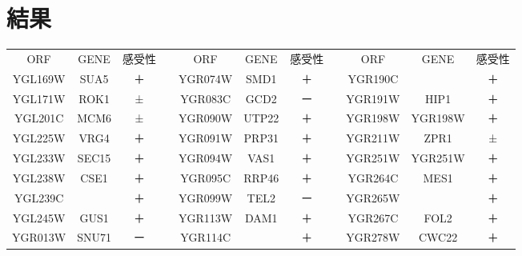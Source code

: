 \documentclass[a4paper,papersize,dvipdfmx]{jsarticle}
\begin{document}
\section*{結果}
\begin{table}[H]
  \centering
\begin{tabular}{|c|c|c|c|c|c|c|cccc}
\cline{1-3} \cline{5-7} \cline{9-11}
ORF     & GENE    & 感受性 &  & ORF     & GENE  & 感受性 & \multicolumn{1}{c|}{} & \multicolumn{1}{c|}{ORF}     & \multicolumn{1}{c|}{GENE}    & \multicolumn{1}{c|}{感受性} \\ \cline{1-3} \cline{5-7} \cline{9-11}
YGL169W & SUA5    & ＋   &  & YGR074W & SMD1  & ＋   & \multicolumn{1}{c|}{} & \multicolumn{1}{c|}{YGR190C} & \multicolumn{1}{c|}{}        & \multicolumn{1}{c|}{＋}   \\ \cline{1-3} \cline{5-7} \cline{9-11}
YGL171W & ROK1    & ±   &  & YGR083C & GCD2  & ー   & \multicolumn{1}{c|}{} & \multicolumn{1}{c|}{YGR191W} & \multicolumn{1}{c|}{HIP1}    & \multicolumn{1}{c|}{＋}   \\ \cline{1-3} \cline{5-7} \cline{9-11}
YGL201C & MCM6    & ±   &  & YGR090W & UTP22 & ＋   & \multicolumn{1}{c|}{} & \multicolumn{1}{c|}{YGR198W} & \multicolumn{1}{c|}{YGR198W} & \multicolumn{1}{c|}{＋}   \\ \cline{1-3} \cline{5-7} \cline{9-11}
YGL225W & VRG4    & ＋   &  & YGR091W & PRP31 & ＋   & \multicolumn{1}{c|}{} & \multicolumn{1}{c|}{YGR211W} & \multicolumn{1}{c|}{ZPR1}    & \multicolumn{1}{c|}{±}   \\ \cline{1-3} \cline{5-7} \cline{9-11}
YGL233W & SEC15   & ＋   &  & YGR094W & VAS1  & ＋   & \multicolumn{1}{c|}{} & \multicolumn{1}{c|}{YGR251W} & \multicolumn{1}{c|}{YGR251W} & \multicolumn{1}{c|}{＋}   \\ \cline{1-3} \cline{5-7} \cline{9-11}
YGL238W & CSE1    & ＋   &  & YGR095C & RRP46 & ＋   & \multicolumn{1}{c|}{} & \multicolumn{1}{c|}{YGR264C} & \multicolumn{1}{c|}{MES1}    & \multicolumn{1}{c|}{＋}   \\ \cline{1-3} \cline{5-7} \cline{9-11}
YGL239C &         & ＋   &  & YGR099W & TEL2  & ー   & \multicolumn{1}{c|}{} & \multicolumn{1}{c|}{YGR265W} & \multicolumn{1}{c|}{}        & \multicolumn{1}{c|}{＋}   \\ \cline{1-3} \cline{5-7} \cline{9-11}
YGL245W & GUS1    & ＋   &  & YGR113W & DAM1  & ＋   & \multicolumn{1}{c|}{} & \multicolumn{1}{c|}{YGR267C} & \multicolumn{1}{c|}{FOL2}    & \multicolumn{1}{c|}{＋}   \\ \cline{1-3} \cline{5-7} \cline{9-11}
YGR013W & SNU71   & ー   &  & YGR114C &       & ＋   & \multicolumn{1}{c|}{} & \multicolumn{1}{c|}{YGR278W} & \multicolumn{1}{c|}{CWC22}   & \multicolumn{1}{c|}{＋}   \\ \cline{1-3} \cline{5-7} \cline{9-11}

\end{tabular}
\end{table}
\end{document}
